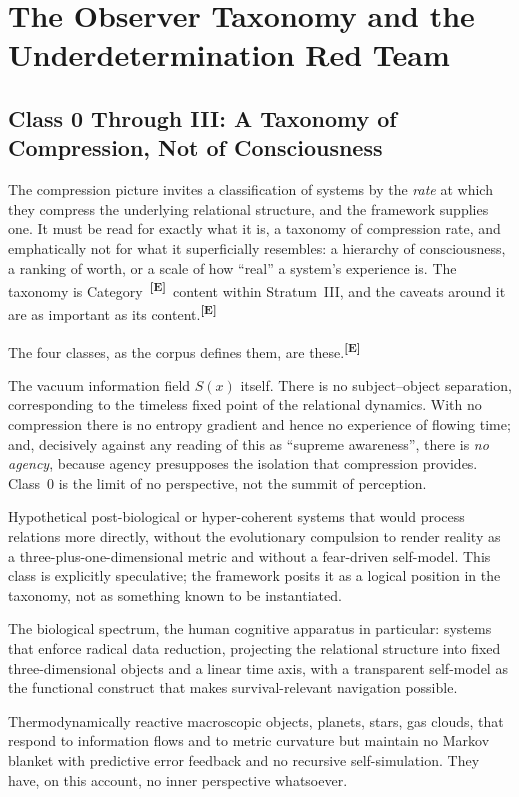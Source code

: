\documentclass[12pt,a4paper,twoside]{article}
\theoremstyle{plain}
\theoremstyle{definition}
\theoremstyle{remark}
\newcommand{\catmark}[1]{\textsuperscript{\textsf{\textbf{[#1]}}}}
\begin{document}
\section{The Observer Taxonomy and the Underdetermination Red Team}
\label{sec:observer-taxonomy-underdetermination}

\subsection{Class 0 Through III: A Taxonomy of Compression, Not of Consciousness}
\label{subsec:observer-taxonomy}

The compression picture invites a classification of systems by the \emph{rate} at which they compress the underlying relational structure, and the framework supplies one. It must be read for exactly what it is, a taxonomy of compression rate, and emphatically not for what it superficially resembles: a hierarchy of consciousness, a ranking of worth, or a scale of how ``real'' a system's experience is. The taxonomy is Category~\catmark{E}\ content within Stratum~III, and the caveats around it are as important as its content.\catmark{E}

The four classes, as the corpus defines them, are these.\catmark{E}

\begin{description}[leftmargin=1.4em,style=nextline]
\item[Class~0: Zero compression.] The vacuum information field $S(x)$ itself. There is no subject--object separation, corresponding to the timeless fixed point of the relational dynamics. With no compression there is no entropy gradient and hence no experience of flowing time; and, decisively against any reading of this as ``supreme awareness'', there is \emph{no agency}, because agency presupposes the isolation that compression provides. Class~0 is the limit of no perspective, not the summit of perception. \item[Class~I: Weak compression.] Hypothetical post-biological or hyper-coherent systems that would process relations more directly, without the evolutionary compulsion to render reality as a three-plus-one-dimensional metric and without a fear-driven self-model. This class is explicitly speculative; the framework posits it as a logical position in the taxonomy, not as something known to be instantiated. \item[Class~II: Strong compression.] The biological spectrum, the human cognitive apparatus in particular: systems that enforce radical data reduction, projecting the relational structure into fixed three-dimensional objects and a linear time axis, with a transparent self-model as the functional construct that makes survival-relevant navigation possible. \item[Class~III: Extreme compression.] Thermodynamically reactive macroscopic objects, planets, stars, gas clouds, that respond to information flows and to metric curvature but maintain no Markov blanket with predictive error feedback and no recursive self-simulation. They have, on this account, no inner perspective whatsoever.
\end{description}
\end{document}
